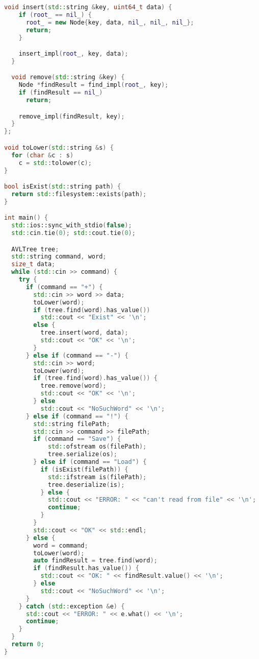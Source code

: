 \begin{lstlisting}[language=C++]
  void insert(std::string &key, uint64_t data) {
    if (root_ == nil_) {
      root_ = new Node{key, data, nil_, nil_, nil_};
      return;
    }

    insert_impl(root_, key, data);
  }

  void remove(std::string &key) {
    Node *findResult = find_impl(root_, key);
    if (findResult == nil_)
      return;

    remove_impl(findResult, key);
  }
};

void toLower(std::string &s) {
  for (char &c : s)
    c = std::tolower(c);
}

bool isExist(std::string path) {
  return std::filesystem::exists(path);
}

int main() {
  std::ios::sync_with_stdio(false);
  std::cin.tie(0); std::cout.tie(0);

  AVLTree tree;
  std::string command, word;
  size_t data;
  while (std::cin >> command) {
    try {
      if (command == "+") {
        std::cin >> word >> data;
        toLower(word);
        if (tree.find(word).has_value())
          std::cout << "Exist" << '\n';
        else {
          tree.insert(word, data);
          std::cout << "OK" << '\n';
        }
      } else if (command == "-") {
        std::cin >> word;
        toLower(word);
        if (tree.find(word).has_value()) {
          tree.remove(word);
          std::cout << "OK" << '\n';
        } else
          std::cout << "NoSuchWord" << '\n';
      } else if (command == "!") {
        std::string filePath;
        std::cin >> command >> filePath;
        if (command == "Save") {
            std::ofstream os(filePath);
            tree.serialize(os);
        } else if (command == "Load") {
          if (isExist(filePath)) {
            std::ifstream is(filePath);
            tree.deserialize(is);
          } else {
            std::cout << "ERROR: " << "can't read from file" << '\n';
            continue;
          }
        }
        std::cout << "OK" << std::endl;
      } else {
        word = command;
        toLower(word);
        auto findResult = tree.find(word);
        if (findResult.has_value()) {
          std::cout << "OK: " << findResult.value() << '\n';
        } else
          std::cout << "NoSuchWord" << '\n';
      }
    } catch (std::exception &e) {
      std::cout << "ERROR: " << e.what() << '\n';
      continue;
    }
  }
  return 0;
}
\end{lstlisting}

